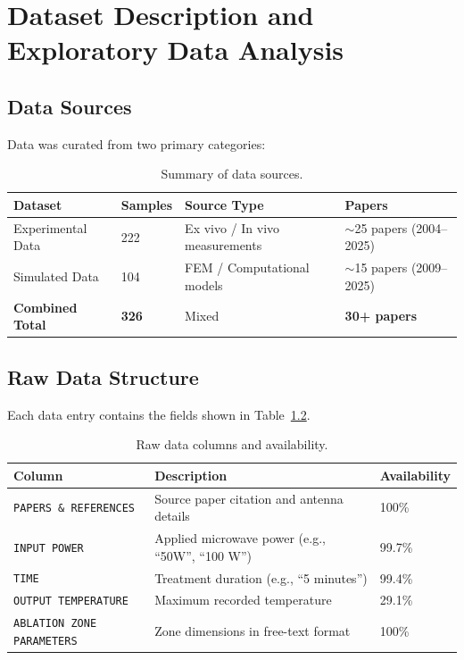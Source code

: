 \chapter{Dataset Description and Exploratory Data Analysis}

\section{Data Sources}

Data was curated from two primary categories:

\begin{table}[H]
\centering
\caption{Summary of data sources.}
\label{tab:data-sources}
\begin{tabular}{llll}
\toprule
\textbf{Dataset} & \textbf{Samples} & \textbf{Source Type} & \textbf{Papers} \\
\midrule
Experimental Data & 222 & Ex vivo / In vivo measurements & $\sim$25 papers (2004--2025) \\
Simulated Data    & 104 & FEM / Computational models     & $\sim$15 papers (2009--2025) \\
\midrule
\textbf{Combined Total} & \textbf{326} & Mixed & \textbf{30+ papers} \\
\bottomrule
\end{tabular}
\end{table}


\section{Raw Data Structure}

Each data entry contains the fields shown in Table~\ref{tab:raw-data}.

\begin{table}[H]
\centering
\caption{Raw data columns and availability.}
\label{tab:raw-data}
\begin{tabular}{p{4.5cm}p{7cm}l}
\toprule
\textbf{Column} & \textbf{Description} & \textbf{Availability} \\
\midrule
\texttt{PAPERS \& REFERENCES}      & Source paper citation and antenna details          & 100\%  \\
\texttt{INPUT POWER}               & Applied microwave power (e.g., ``50W'', ``100 W'')  & 99.7\% \\
\texttt{TIME}                      & Treatment duration (e.g., ``5 minutes'')            & 99.4\% \\
\texttt{OUTPUT TEMPERATURE}        & Maximum recorded temperature                       & 29.1\% \\
\texttt{ABLATION ZONE PARAMETERS}  & Zone dimensions in free-text format                & 100\%  \\
\bottomrule
\end{tabular}
\end{table}

